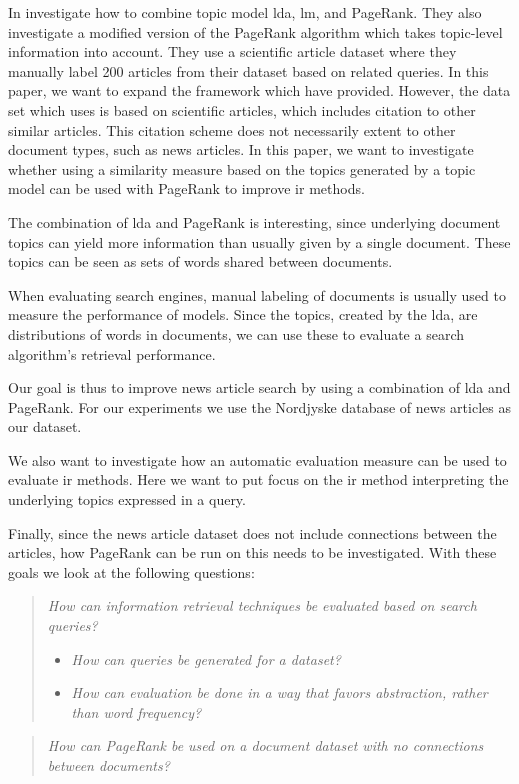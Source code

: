 In \cite{yang2009topic} \citeauthor{yang2009topic} investigate how to combine topic model \gls{lda}, \gls{lm}, and PageRank.
They also investigate a modified version of the PageRank algorithm which takes topic-level information into account.
They use a scientific article dataset where they manually label 200 articles from their dataset based on related queries. 
In this paper, we want to expand the framework which \cite{yang2009topic} have provided.
However, the data set which \cite{yang2009topic} uses is based on scientific articles, which includes citation to other similar articles.
This citation scheme does not necessarily extent to other document types, such as news articles.
In this paper, we want to investigate whether using a similarity measure based on the topics generated by a topic model can be used with PageRank to improve \gls{ir} methods.

The combination of \gls{lda} and PageRank is interesting, since underlying document topics can yield more information than usually given by a single document.
These topics can be seen as sets of words shared between documents. 

When evaluating search engines, manual labeling of documents is usually used to measure the performance of models\cite{yang2009topic}\cite{Tang2008}.
Since the topics, created by the \gls{lda}, are distributions of words in documents, we can use these to evaluate a search algorithm's retrieval performance. 

Our goal is thus to improve news article search by using a combination of \gls{lda} and PageRank.
For our experiments we use the Nordjyske database of news articles as our dataset.

We also want to investigate how an automatic evaluation measure can be used to evaluate \gls{ir} methods.
Here we want to put focus on the \gls{ir} method interpreting the underlying topics expressed in a query.

Finally, since the news article dataset does not include connections between the articles, how PageRank can be run on this needs to be investigated.
With these goals we look at the following questions:

\begin{quote}
	\emph{How can information retrieval techniques be evaluated based on search queries?}
	\begin{itemize}
		\item \emph{How can queries be generated for a dataset?}
		\item \emph{How can evaluation be done in a way that favors abstraction, rather than word frequency?}
	\end{itemize}
\end{quote}
\vspace{0.1 cm}

\begin{quote}
	\emph{How can PageRank be used on a document dataset with no connections between documents?}
\end{quote}




